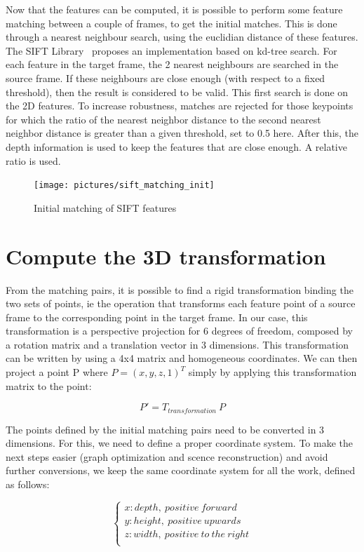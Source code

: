 Now that the features can be computed, it is possible to perform some feature matching between a couple of frames, to get the initial matches. This is done through a nearest neighbour search, using the euclidian distance of these features.  
The SIFT Library~\cite{hess_sift} proposes an implementation based on kd-tree search. For each feature in the target frame, the 2 nearest neighbours are searched in the source frame. If these neighbours are close enough (with respect to a fixed threshold), then the result is considered to be valid. This first search is done on the 2D features. To increase robustness, matches are rejected for those keypoints for which the ratio of the nearest neighbor distance to the second nearest neighbor distance is greater than a given threshold, set to 0.5 here. 
After this, the depth information is used to keep the features that are close enough. A relative ratio is used.

\begin{figure}[h!]
\centering
\texttt{[image: pictures/sift\_matching\_init]}
\caption{Initial matching of SIFT features}
\end{figure}

\section{Compute the 3D transformation}

From the matching pairs, it is possible to find a rigid transformation binding the two sets of points, ie the operation that transforms each feature point of a source frame to the corresponding point in the target frame. In our case, this transformation is a perspective projection for 6 degrees of freedom, composed by a rotation matrix and a translation vector in 3 dimensions. This transformation can be written by using a 4x4  matrix and homogeneous coordinates. We can then project a point P where $P = (x,y,z,1)^T$ simply by applying this transformation matrix to the point:

\[
P' = T_{transformation} \: P
\]

The points defined by the initial matching pairs need to be converted in 3 dimensions. For this, we need to define a proper coordinate system. To make the next steps easier (graph optimization and scence reconstruction) and avoid further conversions, we keep the same coordinate system for all the work, defined as follows:

\[
\left\{\begin{array}{l}
x: depth,\:positive\:forward\\
y: height,\:positive\:upwards\\
z: width,\:positive\:to\:the\:right\\
\end{array}
\right.
\]

